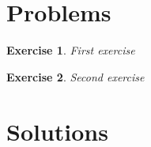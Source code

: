 \documentclass{article}
\newtheorem{ex}{Exercise}
\begin{document}
\section{Problems}
\begin{ex}
First exercise
\end{ex}

\begin{ex}
Second exercise
\end{ex}

\section{Solutions}
\end{document}
